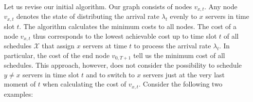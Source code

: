 \documentclass[hidelinks]{article}
\theoremstyle{plain}
\theoremstyle{definition}
\theoremstyle{rem}
\newcommand{\mx}{\mathcal{X}}
\begin{document}
Let us revise our initial algorithm. Our graph consists of nodes $v_{x,t}$. Any node $v_{x,t}$ denotes the state of distributing the arrival rate $\lambda_{t}$ evenly to $x$ servers in time slot $t$. The algorithm calculates the minimum costs to all nodes. The cost of a node $v_{x,t}$ thus corresponds to the lowest achievable cost up to time slot $t$ of all schedules $\mx$ that assign $x$ servers at time $t$ to process the arrival rate $\lambda_t$. In particular, the cost of the end node $v_{0,T+1}$ tell us the minimum cost of all schedules. This approach, however, does not consider the possibility to schedule $y\neq x$ servers in time slot $t$ and to switch to $x$ servers just at the very last moment of $t$ when calculating the cost of $v_{x,t}$. Consider the following two examples:
\end{document}
